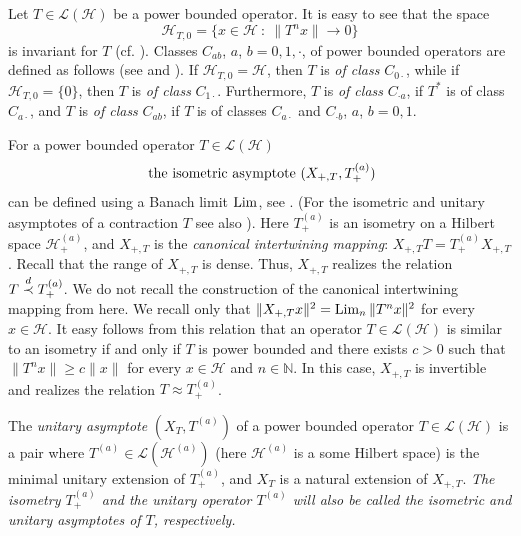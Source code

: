 \documentclass[a4paper,oneside,11pt]{amsart}
\numberwithin{equation}{section}
\theoremstyle{plain}
\theoremstyle{definition}
\begin{document}
Let   $T\in\mathcal L(\mathcal H)$ be a power bounded operator. 
 It is easy to see that the space 
\begin{equation}\label{01}
\mathcal H_{T,0}=\{x\in\mathcal H \ :\ \|T^nx\|\to 0\}
\end{equation}
 is invariant for $T$ (cf. {\cite[Theorem II.5.4]{nfbk}}). Classes $C_{ab}$, $a$, $b=0,1,\cdot$, of power bounded operators 
are defined as follows (see  {\cite[Sec. II.4]{nfbk}} and \cite{ker89}). If $\mathcal H_{T,0}=\mathcal H$, then  $T$ is  \emph{of class} $C_{0\cdot}$, while if  $\mathcal H_{T,0}=\{0\}$, then $T$ is 
 \emph{of class} $C_{1\cdot}$. Furthermore,  $T$  is \emph{of class} $C_{\cdot a}$, if $T^\ast$ is of class  $C_{a\cdot}$,  
 and $T$ is  \emph{of class} $C_{ab}$, if $T$ is of classes $C_{a\cdot}$ and $C_{\cdot b}$, $a$, $b=0,1$. 


For a power bounded operator $T\in\mathcal L(\mathcal H)$ 
\begin{equation*}\text{ the \emph{isometric asymptote} }(X_{+,T},T_+^{(a)}) \end{equation*}   
 can be defined using a Banach limit $\mathop{\text{\rm Lim}}$, see \cite{ker89}. (For the isometric and unitary asymptotes of a contraction $T$ see also {\cite[Sec. IX.1]{nfbk}}). 
Here $T_+^{(a)}$ is an isometry on a Hilbert space $\mathcal H_+^{(a)}$, and $X_{+,T}$ is the \emph{canonical intertwining mapping}: 
$X_{+,T}T=T_+^{(a)}X_{+,T}$. Recall that 
the range of $X_{+,T}$ is dense. 
Thus, $X_{+,T}$ realizes the relation $T\buildrel d\over\prec  T_+^{(a)}$.
 We do not recall the construction of the canonical intertwining mapping from \cite{ker89} here. 
We recall only that $\|X_{+,T}x\|^2=\mathop{\text{\rm Lim}}_n\|T^nx\|^2$ for every $x\in \mathcal H$. 
It easy follows from this relation that an operator  $T\in\mathcal L(\mathcal H)$ is similar 
to an isometry if and only if $T$ is power bounded and there exists $c>0$ such that 
$\|T^nx\|\geq c\|x\|$ for every $x\in\mathcal H$ and $n\in\mathbb N$. In this case, $X_{+,T}$ is invertible 
and realizes the relation $T\approx T_+^{(a)}$. 


The \emph{unitary asymptote} $(X_T,T^{(a)})$ of a power bounded operator $T\in\mathcal L(\mathcal H)$ is a pair where 
 $T^{(a)}\in\mathcal L(\mathcal H^{(a)})$   
(here $\mathcal H^{(a)}$ is a some Hilbert space) 
is the minimal unitary extension of $T_+^{(a)}$, and $X_T$ is a natural extension of $X_{+,T}$. 
\emph{The isometry $T_+^{(a)}$ and the unitary operator  $T^{(a)}$  will also be called the isometric and unitary asymptotes of $T$, respectively.}
\end{document}
